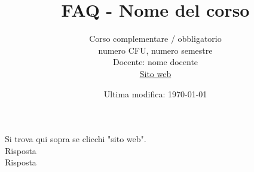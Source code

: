 \documentclass{article}
\title{FAQ - \textbf{Nome del corso}}
\date{Ultima modifica: \today}
\author{Corso complementare / obbligatorio\\numero CFU, numero semestre\\
Docente: nome docente\\ 
\href{}{Sito web}}
\begin{document}
 
\maketitle

\begin{enumerate}

\rmfamily
{} 
Si trova qui sopra se clicchi "sito web".\\
	
Risposta \\

Risposta \\
 
\end{enumerate}
\end{document}
